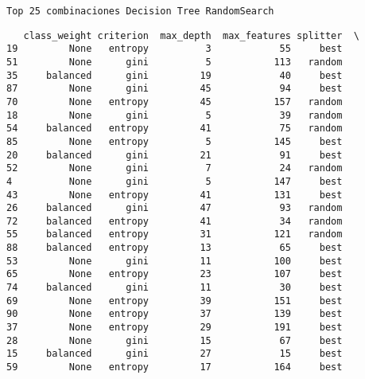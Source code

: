 \documentclass[11pt]{article}
\begin{document}
    
    \begin{Verbatim}[commandchars=\\\{\}]
 
 
 
Top 25 combinaciones Decision Tree RandomSearch

    \end{Verbatim}

    
    \begin{verbatim}
   class_weight criterion  max_depth  max_features splitter  \
19         None   entropy          3            55     best   
51         None      gini          5           113   random   
35     balanced      gini         19            40     best   
87         None      gini         45            94     best   
70         None   entropy         45           157   random   
18         None      gini          5            39   random   
54     balanced   entropy         41            75   random   
85         None   entropy          5           145     best   
20     balanced      gini         21            91     best   
52         None      gini          7            24   random   
4          None      gini          5           147     best   
43         None   entropy         41           131     best   
26     balanced      gini         47            93   random   
72     balanced   entropy         41            34   random   
55     balanced   entropy         31           121   random   
88     balanced   entropy         13            65     best   
53         None      gini         11           100     best   
65         None   entropy         23           107     best   
74     balanced      gini         11            30     best   
69         None   entropy         39           151     best   
90         None   entropy         37           139     best   
37         None   entropy         29           191     best   
28         None      gini         15            67     best   
15     balanced      gini         27            15     best   
59         None   entropy         17           164     best   


\end{verbatim}
\end{document}
